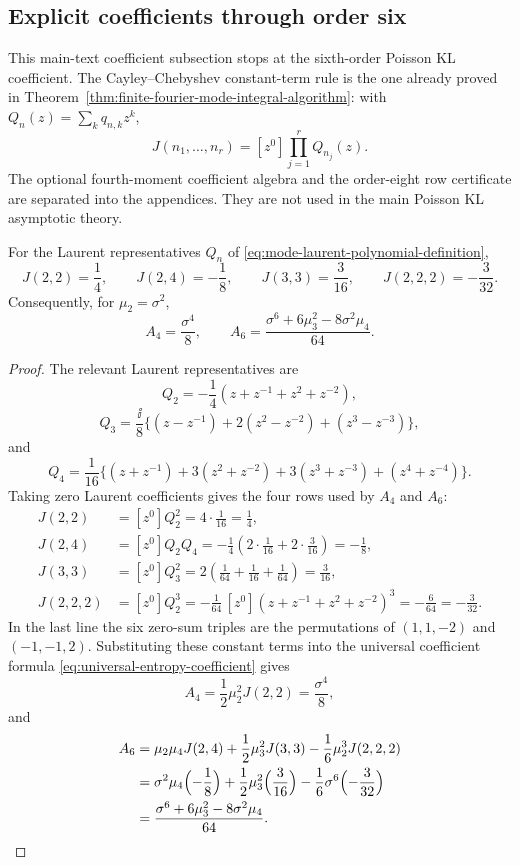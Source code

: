 \subsection{Explicit coefficients through order six}
\label{subsec:explicit-sixth-order-coefficients}

This main-text coefficient subsection stops at the sixth-order Poisson KL
coefficient.  The Cayley--Chebyshev constant-term rule is the one already
proved in Theorem~\ref{thm:finite-fourier-mode-integral-algorithm}: with
\(Q_n(z)=\sum_kq_{n,k}z^k\),
\[
J(n_1,\ldots,n_r)=[z^0]\prod_{j=1}^rQ_{n_j}(z).
\]
The optional fourth-moment coefficient algebra and the order-eight row
certificate are separated into the appendices.  They are not used in the
main Poisson KL asymptotic theory.

\begin{lemma}%
\label{lem:sixth-order-coefficient-arithmetic}
For the Laurent representatives \(Q_n\) of
\eqref{eq:mode-laurent-polynomial-definition},
\[
J(2,2)=\frac14,\qquad
J(2,4)=-\frac18,\qquad
J(3,3)=\frac3{16},\qquad
J(2,2,2)=-\frac3{32}.
\]
Consequently, for \(\mu_2=\sigma^2\),
\[
A_4=\frac{\sigma^4}{8},\qquad
A_6=\frac{\sigma^6+6\mu_3^2-8\sigma^2\mu_4}{64}.
\]
\end{lemma}

\begin{proof}
The relevant Laurent representatives are
\[
Q_2=-\frac14(z+z^{-1}+z^2+z^{-2}),
\]
\[
Q_3=\frac{\ii}{8}\{(z-z^{-1})+2(z^2-z^{-2})+(z^3-z^{-3})\},
\]
and
\[
Q_4=\frac1{16}\{(z+z^{-1})+3(z^2+z^{-2})
  +3(z^3+z^{-3})+(z^4+z^{-4})\}.
\]
Taking zero Laurent coefficients gives the four rows used by \(A_4\) and
\(A_6\):
\[
\begin{aligned}
J(2,2)
&=[z^0]Q_2^2
=4\cdot\frac1{16}
=\frac14,\\
J(2,4)
&=[z^0]Q_2Q_4
=-\frac14\left(2\cdot\frac1{16}+2\cdot\frac3{16}\right)
=-\frac18,\\
J(3,3)
&=[z^0]Q_3^2
=2\left(\frac1{64}+\frac1{16}+\frac1{64}\right)
=\frac3{16},\\
J(2,2,2)
&=[z^0]Q_2^3
=-\frac1{64}\,[z^0](z+z^{-1}+z^2+z^{-2})^3
=-\frac6{64}
=-\frac3{32}.
\end{aligned}
\]
In the last line the six zero-sum triples are the permutations of
\((1,1,-2)\) and \((-1,-1,2)\).  Substituting these constant terms into the
universal coefficient formula \eqref{eq:universal-entropy-coefficient} gives
\[
A_4=\frac12\mu_2^2J(2,2)=\frac{\sigma^4}{8},
\]
and
\[
\begin{aligned}
A_6
&=\mu_2\mu_4J(2,4)+\frac12\mu_3^2J(3,3)
-\frac16\mu_2^3J(2,2,2)\\
&=\sigma^2\mu_4\Bigl(-\frac18\Bigr)
+\frac12\mu_3^2\Bigl(\frac3{16}\Bigr)
-\frac16\sigma^6\Bigl(-\frac3{32}\Bigr)\\
&=\frac{\sigma^6+6\mu_3^2-8\sigma^2\mu_4}{64}.
\end{aligned}
\]
\end{proof}

